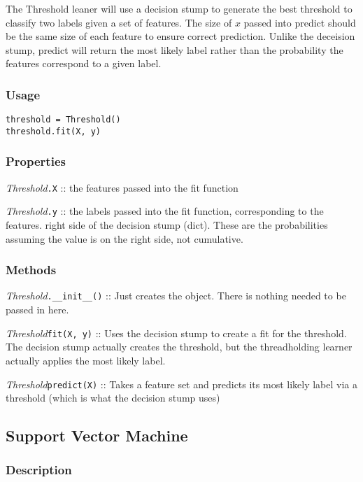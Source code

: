 \documentclass{article}
\begin{document}
The Threshold leaner will use a decision stump to generate the best threshold to
classify two labels given a set of features. The size of $x$ passed into predict
should be the same size of each feature to ensure correct prediction. Unlike the
deceision stump, predict will return the most likely label rather than the
probability the features correspond to a given label.

\subsubsection{Usage}

\begin{verbatim}
threshold = Threshold()
threshold.fit(X, y)
\end{verbatim}

\subsubsection{Properties}

\textit{Threshold}\texttt{.X} :: the features passed into the fit function

\textit{Threshold}\texttt{.y} :: the labels passed into the fit function,
corresponding to the features.
right side of the decision stump (dict).  These are the probabilities assuming
the value is on the right side, not cumulative.

\subsubsection{Methods}

\textit{Threshold}\texttt{.\_\_init\_\_()} :: Just creates the object. There
is nothing needed to be passed in here.

\textit{Threshold}\texttt{fit(X, y)} :: Uses the decision stump to create a fit
for the threshold. The decision stump actually creates the threshold, but the
threadholding learner actually applies the most likely label.

\textit{Threshold}\texttt{predict(X)} :: Takes a feature set and predicts its
most likely label via a threshold (which is what the decision stump uses)

\subsection{Support Vector Machine}

\subsubsection{Description}
\end{document}
